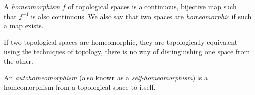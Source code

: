 \documentclass[12pt]{article}
\begin{document}
A \emph{homeomorphism} $f$ of topological spaces is a continuous, bijective map such that $f^{-1}$ is also continuous. We also say that two spaces are \emph{homeomorphic} if such a map exists.

If two topological spaces are homeomorphic, they are topologically equivalent --- using the techniques of topology, there is no way of distinguishing one space from the other.

An \emph{autohomeomorphism} (also known as a \emph{self-homeomorphism}) is a 
homeomorphism from a topological space to itself.
\end{document}
